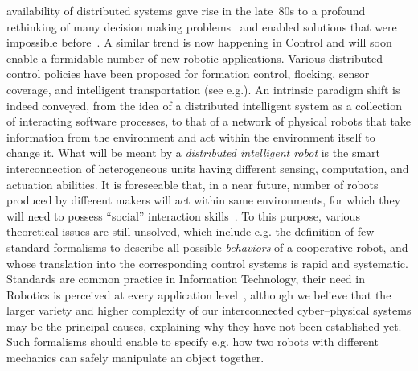 \documentclass[journal, onecolumn, 12pt]{styles/IEEEtran}
\begin{document}
 availability of distributed systems gave rise in the late~$80$s to a profound rethinking of many decision making problems~\cite{bertsekas1991sap, lynch-book} and enabled solutions that were impossible  before~\cite{ceri1984distributed, foster1999grid}. A similar trend is now happening  in Control and will soon enable a formidable number of new robotic applications. Various distributed control policies have been proposed for formation control, flocking, sensor coverage, and intelligent transportation (see e.g.\cite{olfatisaber2006fma, figueiredo2001tdi, ram08-bddlpss, mcqueen1999intelligent}). An intrinsic paradigm shift is indeed conveyed, from the idea of a distributed intelligent system as a collection of interacting software processes, to that of a network of physical robots that take information from the environment and act within the environment itself to change it. What will be meant by a {\em distributed intelligent robot} is the smart interconnection of heterogeneous units having different sensing, computation, and actuation abilities. 
%
%
It is foreseeable that, in a near future, number of robots produced by different makers will act within same environments, for which they will need to possess ``social'' interaction skills~\cite{ram10-bfp}. To this purpose, various theoretical issues are still unsolved, which include e.g. the definition of few standard formalisms to describe all possible {\em behaviors} of a cooperative robot, and whose translation into the corresponding control systems is rapid and systematic.
Standards are common practice in Information Technology, their need in Robotics is perceived at every application level~\cite{ram10-pbb}, although we believe that the larger variety and higher complexity of our interconnected cyber--physical systems may be the principal causes, explaining why they have not been established yet. Such formalisms should enable to specify e.g. how two robots with different mechanics can safely manipulate an object together. 
\end{document}
